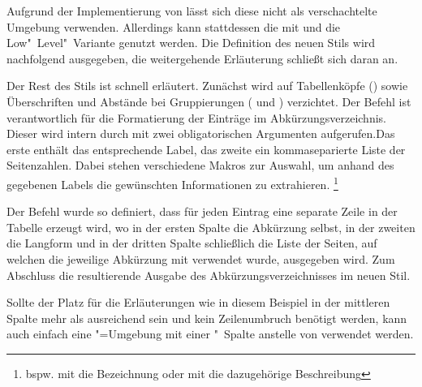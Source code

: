 \documentclass[%
  english,ngerman,%
  cdgeometry=no,DIV=12,automark,%
]{tudscrartcl}
\begin{document}
Aufgrund der Implementierung von  lässt sich diese nicht 
als verschachtelte Umgebung verwenden. Allerdings kann stattdessen die mit 
 und  die Low"~Level"~Variante genutzt 
werden. Die Definition des neuen Stils  wird nachfolgend 
ausgegeben, die weitergehende Erläuterung schließt sich daran an.
%
\CodeHook{\let\newglossarystyle\renewglossarystyle}
\begin{Hint*}

\end{Hint*}
%
Der Rest des Stils ist schnell erläutert. Zunächst wird auf Tabellenköpfe 
() sowie Überschriften und Abstände bei Gruppierungen 
( und ) verzichtet. Der Befehl 
 ist verantwortlich für die Formatierung der Einträge 
im Abkürzungsverzeichnis. Dieser wird intern durch  mit 
zwei obligatorischen Argumenten aufgerufen.Das erste enthält das entsprechende 
Label, das zweite ein kommaseparierte Liste der Seitenzahlen. Dabei stehen 
verschiedene Makros zur Auswahl, um anhand des gegebenen Labels die gewünschten 
Informationen zu extrahieren.%
\footnote{%
  bspw. mit  die Bezeichnung oder mit 
   die dazugehörige Beschreibung%
}

Der Befehl  wurde so definiert, dass für jeden Eintrag eine 
separate Zeile in der Tabelle erzeugt wird, wo in der ersten Spalte die 
Abkürzung selbst, in der zweiten die Langform und in der dritten Spalte 
schließlich die Liste der Seiten, auf welchen die jeweilige Abkürzung mit 
 verwendet wurde, ausgegeben wird. Zum Abschluss 
die resultierende Ausgabe des Abkürzungsverzeichnisses im neuen Stil.
%
\begin{Hint}
\printacronyms[style=acrotabularx]
\end{Hint}
\begin{quoting}[rightmargin=0pt]
\vspace*{-\baselineskipglue}
\InputCode
\end{quoting}
%
Sollte der Platz für die Erläuterungen wie in diesem Beispiel in der mittleren 
Spalte mehr als ausreichend sein und kein Zeilenumbruch benötigt werden, kann 
auch einfach eine "=Umgebung mit einer "~Spalte 
anstelle von  verwendet werden.
\end{document}
